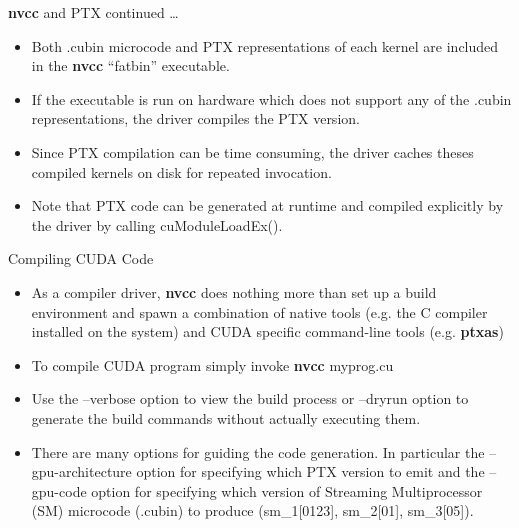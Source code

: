 \documentclass[handout]{beamer}
\begin{document}
\begin{frame}{\textbf{{\selectfont nvcc}} and PTX continued \ldots}
\begin{itemize}
\itemsep1em
	\item<1->Both {\selectfont .cubin} microcode and {\selectfont PTX} representations of each kernel are included in the \textbf{{\selectfont nvcc}} ``fatbin'' executable.
	\item<2->If the executable is run on hardware which does not support any of the {\selectfont .cubin} representations, the driver compiles the {\selectfont PTX} version.
	\item<3->Since {\selectfont PTX} compilation can be time consuming, the driver caches theses compiled kernels on disk for repeated invocation.
	\item<4->Note that {\selectfont PTX} code can be generated at runtime and compiled explicitly by the driver by calling {\selectfont cuModuleLoadEx()}. 
\end{itemize}
\end{frame}

\begin{frame}{Compiling CUDA Code}
\begin{itemize}
	\item<1->As a compiler driver, \textbf{{\selectfont nvcc}} does nothing more than set up a build environment and spawn a combination of native tools (e.g. the C compiler installed on the system) and CUDA specific command-line tools (e.g. \textbf{{\selectfont ptxas}})
	\item<2->To compile CUDA program simply invoke \textbf{{\selectfont nvcc}} {\selectfont myprog.cu}
	\item<3->Use the {\selectfont--verbose} option to view the build process or {\selectfont--dryrun} option to generate the build commands without actually executing them.
	\item<4->There are many options for guiding the code generation.  In particular the {\selectfont--gpu-architecture} option for specifying which {\selectfont PTX} version to emit and the {\selectfont--gpu-code} option for specifying which version of Streaming Multiprocessor (SM) microcode ({\selectfont.cubin}) to produce ({\selectfont sm\_1[0123]}, {\selectfont sm\_2[01]}, {\selectfont sm\_3[05]}).
\end{itemize}
\end{frame}
\end{document}
